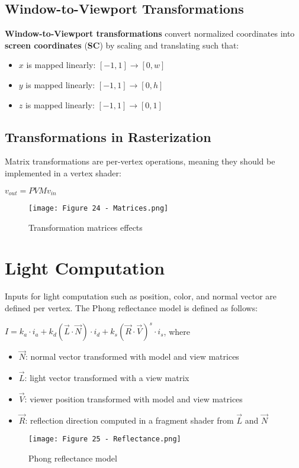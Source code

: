 \documentclass{article}
\begin{document}
\subsection{Window-to-Viewport Transformations}
\textbf{Window-to-Viewport transformations} convert normalized coordinates into \textbf{screen coordinates} (\textbf{SC}) by scaling and translating such that:
\begin{itemize}
    \item $x$ is mapped linearly: $[-1,1] \rightarrow [0,w]$
    \item $y$ is mapped linearly: $[-1,1] \rightarrow [0,h]$
    \item $z$ is mapped linearly: $[-1,1] \rightarrow [0,1]$
\end{itemize}
\subsection{Transformations in Rasterization}
Matrix transformations are per-vertex operations, meaning they should be implemented in a vertex shader:
\begin{center}
    $v_{out} = PVMv_{in}$
\end{center}
\begin{figure}[H]
    \centering
    \texttt{[image: Figure 24 - Matrices.png]}
    \caption{Transformation matrices effects}
\end{figure}

\newpage

\section{Light Computation}
Inputs for light computation such as position, color, and normal vector are defined per vertex. The Phong reflectance model is defined as follows:
\begin{center}
    $I = k_a \cdot i_a + k_d(\vec{L} \cdot \vec{N}) \cdot i_d + k_s(\vec{R} \cdot \vec{V})^s \cdot i_s$, where
\end{center}
\begin{itemize}
    \item $\vec{N}$: normal vector transformed with model and view matrices
    \item $\vec{L}$: light vector transformed with a view matrix
    \item $\vec{V}$: viewer position transformed with model and view matrices
    \item $\vec{R}$: reflection direction computed in a fragment shader from $\vec{L}$ and $\vec{N}$
\end{itemize}
\begin{figure}[H]
    \centering
    \texttt{[image: Figure 25 - Reflectance.png]}
    \caption{Phong reflectance model}
\end{figure}
\end{document}
